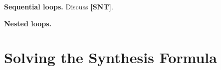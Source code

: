 \documentclass[preprint]{sigplanconf}
\theoremstyle{definition}
\newtheorem{definition}[theorem]{Definition}
\begin{document}



{\bf Sequential loops.}
Discuss {\bf [SNT]}.

{\bf Nested loops.}





\section{Solving the Synthesis Formula} \label{sec:synthesis}
%
\iffalse
\end{document}
